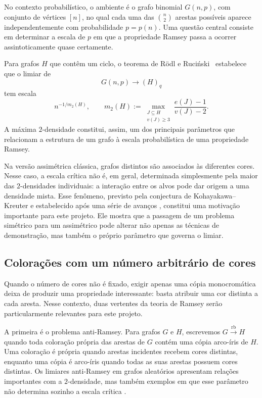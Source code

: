 \documentclass[11pt,a4paper]{article}
\newcommand{\rb}{\stackrel{\mathrm{rb}}{\longrightarrow}}
\newcommand{\Gnp}{G(n,p)}
\theoremstyle{plain}
\theoremstyle{definition}
\begin{document}
No contexto probabilístico, o ambiente é o grafo binomial $\Gnp$, com conjunto
de vértices $[n]$, no qual cada uma das $\binom n2$ arestas possíveis aparece
independentemente com probabilidade $p=p(n)$. Uma questão central consiste em
determinar a escala de $p$ em que a propriedade Ramsey passa a ocorrer
assintoticamente quase certamente.

Para grafos $H$ que contêm um ciclo, o teorema de Rödl e
Ruciński~\cite{RR} estabelece que o limiar de
\[
  \Gnp\longrightarrow(H)_q
\]
tem escala
\[
  n^{-1/m_2(H)},
  \qquad
  m_2(H)
  :=
  \max_{\substack{J\subseteq H\\v(J)\ge3}}
  \frac{e(J)-1}{v(J)-2}.
\]
A máxima $2$-densidade constitui, assim, um dos principais parâmetros que
relacionam a estrutura de um grafo à escala probabilística de uma propriedade
Ramsey.

Na versão assimétrica clássica, grafos distintos são associados às diferentes
cores. Nesse caso, a escala crítica não é, em geral, determinada simplesmente
pela maior das $2$-densidades individuais: a interação entre os alvos pode dar
origem a uma densidade mista. Esse fenômeno, previsto pela conjectura de
Kohayakawa--Kreuter e estabelecido após uma série de avanços
\cite{MNS,BHH,KSW,CMSW}, constitui uma motivação importante para este projeto.
Ele mostra que a passagem de um problema simétrico para um assimétrico pode
alterar não apenas as técnicas de demonstração, mas também o próprio parâmetro
que governa o limiar.


\subsection{Colorações com um número arbitrário de cores}


Quando o número de cores não é fixado, exigir apenas uma cópia monocromática
deixa de produzir uma propriedade interessante: basta atribuir uma cor distinta
a cada aresta. Nesse contexto, duas vertentes da teoria de Ramsey serão
particularmente relevantes para este projeto.

A primeira é o problema anti-Ramsey. Para grafos $G$ e $H$, escrevemos
$G\rb H$
quando toda coloração própria das arestas de $G$ contém uma cópia arco-íris
de $H$. Uma coloração é própria quando arestas incidentes recebem cores
distintas, enquanto uma cópia é arco-íris quando todas as suas arestas possuem
cores distintas. Os limiares anti-Ramsey em grafos aleatórios apresentam
relações importantes com a $2$-densidade, mas também exemplos em que esse
parâmetro não determina sozinho a escala crítica
\cite{KKM,BCMP,KMPS,KKM2,AMMMM,Kup}.
\end{document}
